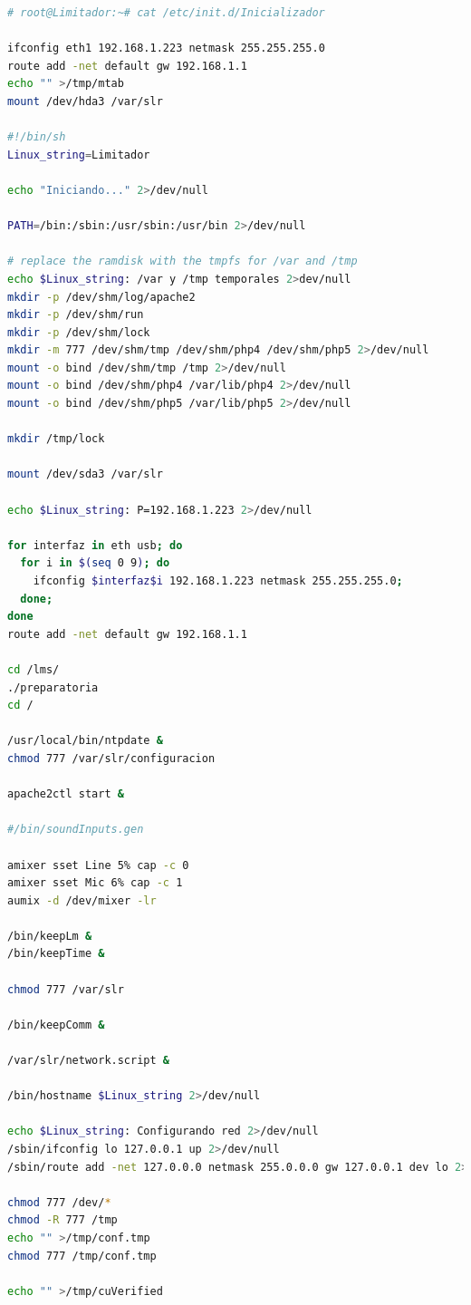 \begin{lstlisting}[language=bash, caption={Script de arranque primario del LM7.}, label={lst:lms7-init}]
# root@Limitador:~# cat /etc/init.d/Inicializador

ifconfig eth1 192.168.1.223 netmask 255.255.255.0
route add -net default gw 192.168.1.1
echo "" >/tmp/mtab
mount /dev/hda3 /var/slr

#!/bin/sh
Linux_string=Limitador

echo "Iniciando..." 2>/dev/null

PATH=/bin:/sbin:/usr/sbin:/usr/bin 2>/dev/null

# replace the ramdisk with the tmpfs for /var and /tmp
echo $Linux_string: /var y /tmp temporales 2>dev/null
mkdir -p /dev/shm/log/apache2
mkdir -p /dev/shm/run
mkdir -p /dev/shm/lock
mkdir -m 777 /dev/shm/tmp /dev/shm/php4 /dev/shm/php5 2>/dev/null
mount -o bind /dev/shm/tmp /tmp 2>/dev/null
mount -o bind /dev/shm/php4 /var/lib/php4 2>/dev/null
mount -o bind /dev/shm/php5 /var/lib/php5 2>/dev/null

mkdir /tmp/lock

mount /dev/sda3 /var/slr

echo $Linux_string: P=192.168.1.223 2>/dev/null

for interfaz in eth usb; do
  for i in $(seq 0 9); do
    ifconfig $interfaz$i 192.168.1.223 netmask 255.255.255.0;
  done;
done
route add -net default gw 192.168.1.1

cd /lms/
./preparatoria
cd /

/usr/local/bin/ntpdate &
chmod 777 /var/slr/configuracion

apache2ctl start &

#/bin/soundInputs.gen

amixer sset Line 5% cap -c 0
amixer sset Mic 6% cap -c 1
aumix -d /dev/mixer -lr

/bin/keepLm &
/bin/keepTime &

chmod 777 /var/slr

/bin/keepComm &

/var/slr/network.script &

/bin/hostname $Linux_string 2>/dev/null

echo $Linux_string: Configurando red 2>/dev/null
/sbin/ifconfig lo 127.0.0.1 up 2>/dev/null
/sbin/route add -net 127.0.0.0 netmask 255.0.0.0 gw 127.0.0.1 dev lo 2>/dev/null

chmod 777 /dev/*
chmod -R 777 /tmp
echo "" >/tmp/conf.tmp
chmod 777 /tmp/conf.tmp

echo "" >/tmp/cuVerified


\end{lstlisting}
